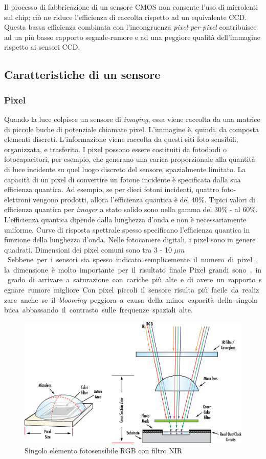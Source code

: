 Il processo di fabbricazione di un sensore CMOS non consente l'uso di
microlenti sul chip; ciò ne riduce  l'efficienza di raccolta rispetto ad un equivalente CCD. Questa bassa efficienza combinata con l'incongruenza  \emph{pixel-per-pixel} contribuisce ad un più basso rapporto segnale-rumore e ad una peggiore qualità dell'immagine rispetto ai sensori CCD.

\subsection{Caratteristiche di un sensore}

\subsubsection{Pixel}
Quando la luce colpisce un sensore di \emph{imaging}, essa viene raccolta da una matrice di piccole buche di potenziale chiamate pixel.
L'immagine è, quindi, da composta elementi discreti. L'informazione viene raccolta da questi siti foto sensibili, organizzata, e trasferita.
I pixel possono essere costituiti da fotodiodi o fotocapacitori, per esempio, che generano una carica proporzionale alla quantità di luce incidente su quel luogo discreto del sensore, spazialmente limitato. La capacità di un pixel di convertire un fotone incidente è specificata dalla sua efficienza quantica. Ad esempio, se per dieci fotoni incidenti, quattro foto-elettroni vengono prodotti, allora l'efficienza quantica è del 40\%. Tipici valori di efficienza quantica per \emph{imager} a stato solido sono nella gamma del 30\% - al 60\%. L'efficienza quantica dipende dalla lunghezza d'onda e non è necessariamente uniforme. Curve di risposta spettrale spesso specificano l'efficienza quantica in funzione della lunghezza d'onda.
Nelle fotocamere digitali, i pixel sono in genere quadrati. Dimensioni dei pixel comuni sono tra 3 - 10 \unit{$\mu m$}. Sebbene per i sensori sia spesso indicato semplicemente il numero di pixel, la dimensione è molto importante per il risultato finale. Pixel grandi sono, in grado di arrivare a saturazione con cariche più alte e di avere un rapporto segnare rumore migliore. Con pixel piccoli il sensore risulta più facile da realizzare anche se il \emph{blooming} peggiora a causa della minor capacità della singola buca abbassando il contrasto sulle frequenze spaziali alte.
\begin{figure}[!ht]
\centering
\includegraphics[width=.8\textwidth]{img/pixel.png}
\caption{Singolo elemento fotosensibile RGB con filtro NIR}
\label{fig:pixel}
\end{figure}

